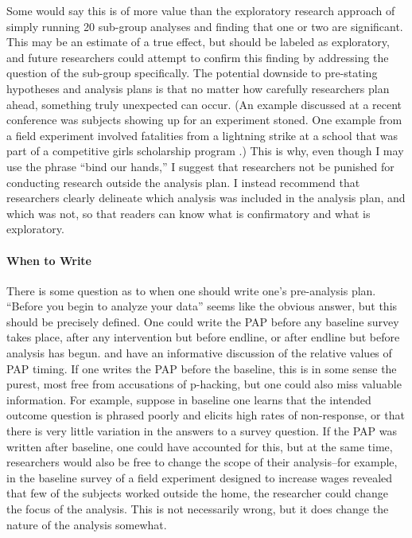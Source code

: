 \documentclass[12pt] {article}
\begin{document}
Some would say this is of more value than the exploratory research approach of simply running 20 sub-group analyses and finding that one or two are significant. This may be an estimate of a true effect, but should be labeled as exploratory, and future researchers could attempt to confirm this finding by addressing the question of the sub-group specifically. The potential downside to pre-stating hypotheses and analysis plans is that no matter how carefully researchers plan ahead, something truly unexpected can occur. (An example discussed at a recent conference was subjects showing up for an experiment stoned. One example from a field experiment involved fatalities from a lightning strike at a school that was part of a competitive girls scholarship program \citep{kremer2009incentives}.) This is why, even though I may use the phrase ``bind our hands,'' I suggest that researchers not be punished for conducting research outside the analysis plan. I instead recommend that researchers clearly delineate which analysis was included in the analysis plan, and which was not, so that readers can know what is confirmatory and what is exploratory.


\paragraph{When to Write}
There is some question as to when one should write one's pre-analysis plan. ``Before you begin to analyze your data'' seems like the obvious answer, but this should be precisely defined. One could write the PAP before any baseline survey takes place, after any intervention but before endline, or after endline but before analysis has begun. \cite{glennerster_running_2013} and \cite{OlkenPAP} have an informative discussion of the relative values of PAP timing. If one writes the PAP before the baseline, this is in some sense the purest, most free from accusations of p-hacking, but one could also miss valuable information. For example, suppose in baseline one learns that the intended outcome question is phrased poorly and elicits high rates of non-response, or that there is very little variation in the answers to a survey question. If the PAP was written after baseline, one could have accounted for this, but at the same time, researchers would also be free to change the scope of their analysis--for example, in the baseline survey of a field experiment designed to increase wages revealed that few of the subjects worked outside the home, the researcher could change the focus of the analysis. This is not necessarily wrong, but it does change the nature of the analysis somewhat.
\end{document}
